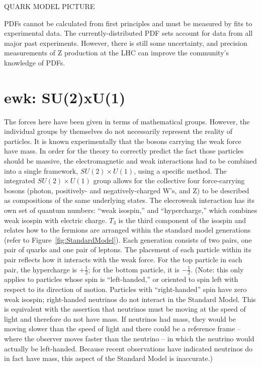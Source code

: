 QUARK MODEL PICTURE

PDFs cannot be calculated from first 
principles and must be measured by fits 
to experimental data.  
The currently-distributed PDF sets 
account for data from all major past experiments.  
However, there is still some uncertainty, 
and precision measurements of Z production 
at the LHC can %
improve the community's knowledge of PDFs.  

\section{ewk: SU(2)xU(1)}
The forces here have been given in terms 
of mathematical groups.  
However, the individual groups by themselves 
do not necessarily represent the reality of particles.  
It is known experimentally that the bosons carrying 
the weak force have mass.  
In order for the theory to correctly predict the 
fact those particles should be massive, 
the electromagnetic and weak interactions had to be combined 
into a single framework, 
$SU(2) \times U(1)$, using a specific method.  
The integrated $SU(2) \times U(1)$ group 
allows for the collective four force-carrying bosons 
(photon, positively- and negatively-charged W's, and Z) 
to be described as compositions of the same underlying states.  
The elecroweak interaction has its own set of quantum 
numbers: ``weak isospin,'' and ``hypercharge,'' 
which combines weak isospin with electric charge.  
$T_3$ is the third component of the isospin 
and relates how to the fermions are arranged 
within the standard model generations 
(refer to Figure~\ref{fig:StandardModel}).  
Each generation consists of two pairs, 
one pair of quarks and one pair of leptons.  
The placement of each particle within its pair 
reflects how it interacts with the weak force.  
For the top particle in each pair, the hypercharge 
is $+\frac{1}{2}$; 
for the bottom particle, it is $-\frac{1}{2}$.  
(Note: this only applies to particles whose spin 
is ``left-handed,'' 
or oriented to spin left with respect to its direction of motion.  
Particles with ``right-handed'' spin have zero weak isospin; 
right-handed neutrinos do not interact in the Standard Model.  
This is equivalent with the assertion that neutrinos 
must be moving at the speed of light and therefore 
do not have mass. 
If neutrinos had mass, 
they would be moving slower than the speed of light 
and there could be a reference frame -- 
where the observer moves faster than the neutrino -- 
in which the neutrino would actually be left-handed.  
Because recent observations have indicated neutrinos %
do in fact have mass, 
this aspect of the Standard Model is inaccurate.)  

